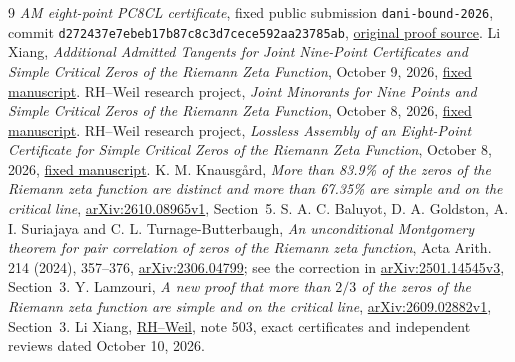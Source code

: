 \documentclass[11pt,a4paper]{article}
\begin{document}
\begin{thebibliography}{9}
\emph{AM eight-point PC8CL certificate}, fixed public submission
\texttt{dani-bound-2026}, commit
\texttt{d272437e7ebeb17b87c8c3d7cece592aa23785ab},
\href{https://github.com/josusanmartin/riemann/tree/d272437e7ebeb17b87c8c3d7cece592aa23785ab/submissions/dani-bound-2026/proof}{original proof source}.
Li Xiang, \emph{Additional Admitted Tangents for Joint Nine-Point
Certificates and Simple Critical Zeros of the Riemann Zeta Function},
October 9, 2026,
\href{https://github.com/lixiang90/RH-Weil/blob/d99bfa29ff9ac1487a42f1b8f3d3925b660396a3/papers/expanded-nine-point-tangent-simple-critical-paper.tex}{fixed manuscript}.
RH--Weil research project, \emph{Joint Minorants for Nine Points and Simple Critical
Zeros of the Riemann Zeta Function}, October 8, 2026,
\href{https://github.com/lixiang90/RH-Weil/blob/609fe754aa6e9b22142f9539ddc28107145442f3/papers/nine-point-joint-minorant-simple-critical-paper.tex}{fixed manuscript}.
RH--Weil research project, \emph{Lossless Assembly of an Eight-Point Certificate for
Simple Critical Zeros of the Riemann Zeta Function}, October 8, 2026,
\href{https://github.com/lixiang90/RH-Weil/blob/0f7e6c21769b7a848fc9ce4cbf498eb91184874d/papers/lossless-eight-point-simple-critical-paper.tex}{fixed manuscript}.
K. M. Knausg{\aa}rd, \emph{More than 83.9\% of the zeros of the
Riemann zeta function are distinct and more than 67.35\% are simple
and on the critical line},
\href{https://arxiv.org/abs/2610.08965v1}{arXiv:2610.08965v1}, Section~5.
S. A. C. Baluyot, D. A. Goldston, A. I. Suriajaya and
C. L. Turnage-Butterbaugh, \emph{An unconditional Montgomery theorem
for pair correlation of zeros of the Riemann zeta function},
Acta Arith. 214 (2024), 357--376,
\href{https://arxiv.org/abs/2306.04799}{arXiv:2306.04799}; see the
correction in \href{https://arxiv.org/abs/2501.14545v3}{arXiv:2501.14545v3}, Section~3.
Y. Lamzouri, \emph{A new proof that more than $2/3$ of the zeros of
the Riemann zeta function are simple and on the critical line},
\href{https://arxiv.org/abs/2609.02882v1}{arXiv:2609.02882v1}, Section~3.
Li Xiang, \href{https://github.com/lixiang90/RH-Weil}{RH--Weil},
note 503, exact certificates and independent reviews dated
October 10, 2026.
\end{thebibliography}
\end{document}
